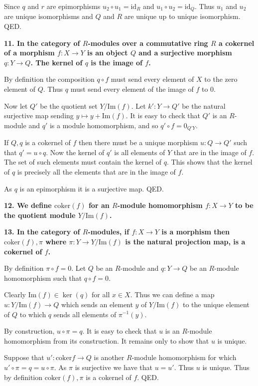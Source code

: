 \documentclass[12pt]{article}
\begin{document}
Since $q$ and $r$ are epimorphisms $u_2\circ u_1 = \mbox{id}_R$ and $u_1\circ u_2 = \mbox{id}_Q$. Thus $u_1$ and $u_2$ are unique isomorphisms and $Q$ and $R$ are unique up to unique isomorphism. QED.

\textbf{11. In the category of $R$-modules over a commutative ring $R$ a cokernel of a morphism $f : X \to Y$ is an object $Q$ and a surjective morphism $q : Y \to Q$. The kernel of $q$ is the image of $f$.}

By definition the composition $q\circ f$ must send every element of $X$ to the zero element of $Q$. Thus $q$ must send every element of the image of $f$ to $0$.

Now let $Q'$ be the quotient set $Y/\mbox{Im}(f)$. Let $k' : Y \to Q'$ be the natural surjective map sending $y \mapsto y + \mbox{Im}(f)$. It is easy to check that $Q'$ is an $R$-module and $q'$ is a module homomorphism, and so $q'\circ f = 0_{Q'Y}$.

If $Q, q$ is a cokernel of $f$ then there must be a unique morphism $u : Q \to Q'$ such that $q' = u\circ q$. Now the kernel of $q'$ is all elements of $Y$ that are in the image of $f$. The set of such elements must contain the kernel of $q$. This shows that the kernel of $q$ is precisely all the elements that are in the image of $f$.

As $q$ is an epimorphism it is a surjective map. QED.

\textbf{12. We define $\mbox{coker}(f)$ for an $R$-module homomorphism $f : X \to Y$ to be the quotient module $Y/\mbox{Im}(f)$.}

\textbf{13. In the category of $R$-modules, if $f : X \to Y$ is a morphism then $\mbox{coker}(f), \pi$ where $\pi : Y \to Y/\mbox{Im}(f)$ is the natural projection map, is a cokernel of $f$.}

By definition $\pi\circ f = 0$. Let $Q$ be an $R$-module and $q : Y \to Q$ be an $R$-module homomorphism such that $q\circ f = 0$.

Clearly $\mbox{Im}(f) \in \ker(q)$ for all $x \in X$. Thus we can define a map $u : Y/\mbox{Im}(f) \to Q$ which sends an element $y$ of $Y/\mbox{Im}(f)$ to the unique element of $Q$ to which $q$ sends all elements of $\pi^{-1}(y)$.

By construction, $u\circ \pi = q$. It is easy to check that $u$ is an $R$-module homomorphism from its construction. It remains only to show that $u$ is unique.

Suppose that $u' : \mbox{coker}{f} \to Q$ is another $R$-module homomorphism for which $u'\circ \pi = q = u\circ \pi$. As $\pi$ is surjective we have that $u = u'$. Thus $u$ is unique. Thus by definition $\mbox{coker}(f), \pi$ is a cokernel of $f$. QED.
\end{document}
